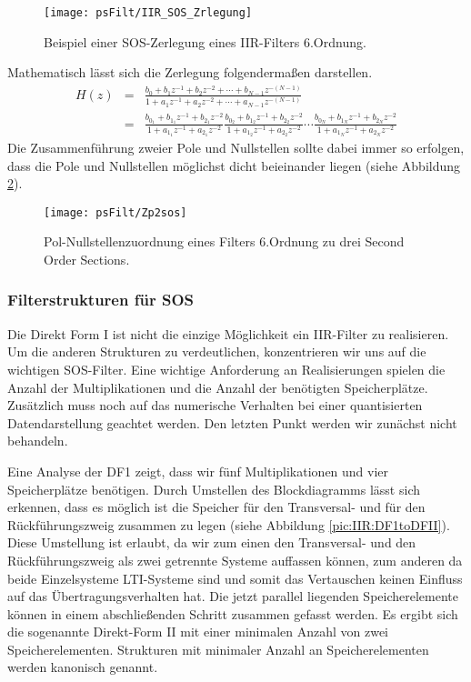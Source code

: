 \begin{figure}[H]
\begin{center}
\texttt{[image: psFilt/IIR\_SOS\_Zrlegung]}
\caption{\label{pic:SOS_Zerlegung}Beispiel einer SOS-Zerlegung eines IIR-Filters 6.Ordnung.}
\end{center}
\end{figure}


Mathematisch lässt sich die Zerlegung folgendermaßen darstellen.
\begin{eqnarray}\label{eq:SOS:Zerlegung}
    H(z) &=& \frac{b_0 + b_1 z^{-1} +  b_2 z^{-2} + \cdots +  b_{N-1} z^{-(N-1)}}
                  {1 + a_1 z^{-1} +  a_2 z^{-2} + \cdots +  a_{N-1} z^{-(N-1)}} \\
         & = & \frac{b_{0_1} + b_{1_1} z^{-1} +  b_{2_1} z^{-2} }{1 + a_{1_1} z^{-1} + a_{2_1} z^{-2}}
         \frac{b_{0_2} + b_{1_2} z^{-1} +  b_{2_2} z^{-2} }{1 + a_{1_2} z^{-1} + a_{2_2} z^{-2}}  \cdots
         \frac{b_{0_N} + b_{1_N} z^{-1} +  b_{2_N} z^{-2} }{1 + a_{1_N} z^{-1} + a_{2_N} z^{-2}}
\end{eqnarray}
Die Zusammenführung zweier Pole und Nullstellen sollte dabei immer so erfolgen, dass die Pole
und Nullstellen möglichst dicht beieinander liegen (siehe Abbildung \ref{pic:SOS_ZerlegungZEbene}).

\begin{figure}[H]
\begin{center}
\texttt{[image: psFilt/Zp2sos]}
\caption{\label{pic:SOS_ZerlegungZEbene}Pol-Nullstellenzuordnung eines Filters 6.Ordnung zu
drei Second Order Sections.}
\end{center}
\end{figure}

\subsubsection{Filterstrukturen für SOS}
Die Direkt Form I ist nicht die einzige Möglichkeit ein IIR-Filter zu realisieren. Um die anderen
Strukturen zu verdeutlichen, konzentrieren wir uns auf die wichtigen SOS-Filter. Eine wichtige
Anforderung an Realisierungen spielen die Anzahl der Multiplikationen und die Anzahl der benötigten
Speicherplätze. Zusätzlich muss noch auf das numerische Verhalten bei einer quantisierten
Datendarstellung geachtet werden. Den letzten Punkt werden wir zunächst nicht behandeln.

Eine Analyse der DF1 zeigt, dass wir fünf Multiplikationen und vier Speicherplätze benötigen.
Durch Umstellen des Blockdiagramms lässt sich erkennen, dass es möglich ist die Speicher
für den Transversal- und für den Rückführungszweig zusammen zu legen (siehe Abbildung \ref{pic:IIR:DF1toDFII}).
Diese Umstellung ist erlaubt, da wir zum einen den Transversal- und den Rückführungszweig als zwei getrennte
Systeme auffassen können, zum anderen da beide Einzelsysteme LTI-Systeme sind und somit
das Vertauschen keinen Einfluss auf das Übertragungsverhalten hat. Die jetzt parallel liegenden
Speicherelemente können in einem abschließenden Schritt zusammen gefasst werden.
Es ergibt sich die sogenannte Direkt-Form II mit einer minimalen Anzahl von zwei Speicherelementen.
Strukturen mit minimaler Anzahl an Speicherelementen werden kanonisch genannt.

